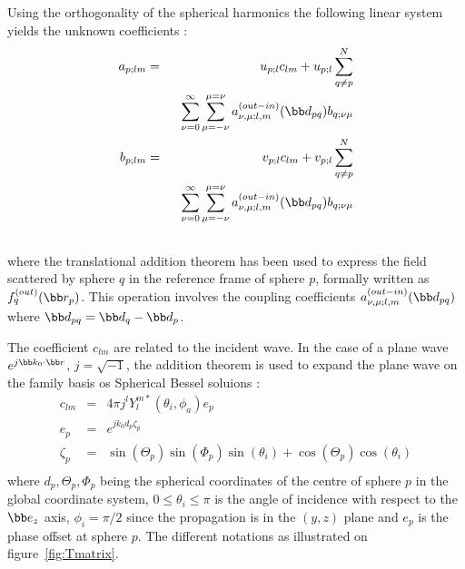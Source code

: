 Using the orthogonality of the spherical harmonics
the following linear system yields the unknown coefficients :
%
\begin{eqnarray}
  a_{p;lm} &=& u_{p;l}c_{lm} + u_{p;l}\sum_{q\neq p}^{N} \nonumber\\
    &&~~\sum_{\nu=0}^{\infty}\sum_{\mu=-\nu}^{\mu=\nu}
      a_{\nu,\mu;l,m}^{(out-in)}(\bb d_{pq})b_{q;\nu\mu}\label{eq:aplm}\\
  b_{p;lm} &=& v_{p;l}c_{lm} + v_{p;l} \sum_{q\neq p}^{N}\nonumber\\
    &&~~\sum_{\nu=0}^{\infty}\sum_{\mu=-\nu}^{\mu=\nu}
      a_{\nu,\mu;l,m}^{(out-in)}(\bb d_{pq})b_{q;\nu\mu}\label{eq:bplm}\\\nonumber
\end{eqnarray}
%
where
the translational addition theorem\cite{Dufva2008} has been
used to express the field scattered by sphere $q$ in the reference
frame of sphere $p$, formally written as $f_q^{(out)}(\bb r_p)$.
This operation involves the coupling coefficients
$a_{\nu,\mu;l,m}^{(out-in)}(\bb d_{pq})$
where $\bb d_{pq}=\bb d_q-\bb d_p$.
%
%

The coefficient $c_{lm}$ are related to the incident wave.
In the case of a plane wave $e^{j\bb k_0\cdot\bb r}$, $j=\sqrt{-1}$,
the addition theorem is used to expand the plane wave on
the family basis os Spherical Bessel soluions :
\begin{eqnarray*}
  c_{lm}  &=& 4\pi j^l Y_l^{m*}\left(\theta_i,\phi_a\right)e_p\\
  e_p     &=& e^{jk_0d_p\zeta_p}\\
  \zeta_p &=& \sin(\Theta_p)\sin(\Phi_p)\sin(\theta_i)+
              \cos(\Theta_p)\cos(\theta_i)\\
\end{eqnarray*}
%
where $d_p,\Theta_p,\Phi_p$ being the spherical coordinates of the
centre of sphere $p$ in the global coordinate system,
$0\le\theta_i\le\pi$ is the angle of incidence with respect to
the $\bb e_z$ axis, $\phi_i=\pi/2$ since the propagation is in the $(y,z)$
plane and $e_p$ is the phase offset at sphere $p$.
The different notations as illustrated on figure~\ref{fig:Tmatrix}.

